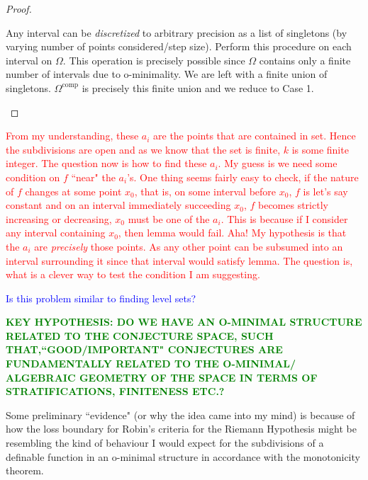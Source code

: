 \begin{proof}
\begin{itemize}
        Any interval can be \textit{discretized} to arbitrary precision as a list of singletons (by varying number of points considered/step size). Perform this procedure on each interval on $\Omega$. This operation is precisely possible since $\Omega$ contains only a finite number of intervals due to o-minimality. We are left with a finite union of singletons. $\Omega^\text{comp}$ is precisely this finite union and we reduce to Case 1.
    \end{itemize}
\end{proof}

\textcolor{red}{From my understanding, these $a_i$ are the points that are contained in set. Hence the subdivisions are open and as we know that the set is finite, $k$ is some finite integer. The question now is how to find these $a_i$. My guess is we need some condition on $f$ ``near" the $a_i$'s. One thing seems fairly easy to check, if the nature of $f$ changes at some point $x_0$, that is, on some interval before $x_0$, $f$ is let's say constant and on an interval immediately succeeding $x_0$, $f$ becomes strictly increasing or decreasing, $x_0$ must be one of the $a_i$. This is because if I consider any interval containing $x_0$, then lemma would fail. Aha! My hypothesis is that the $a_i$ are \textit{precisely} those points. As any other point can be subsumed into an interval surrounding it since that interval would satisfy lemma. The question is, what is a clever way to test the condition I am suggesting.}
\par
\textcolor{blue}{Is this problem similar to finding level sets?}

\textcolor{green}{\textbf{KEY HYPOTHESIS: DO WE HAVE AN O-MINIMAL STRUCTURE RELATED TO THE CONJECTURE SPACE, SUCH THAT,``GOOD/IMPORTANT" CONJECTURES 
ARE FUNDAMENTALLY RELATED TO THE O-MINIMAL/ ALGEBRAIC GEOMETRY OF THE SPACE IN TERMS OF STRATIFICATIONS, FINITENESS ETC.?}
}

Some preliminary ``evidence" (or why the idea came into my mind) is because of how the loss boundary for Robin's criteria for the Riemann Hypothesis might be resembling the kind of behaviour I would expect for the subdivisions of a definable function in an o-minimal structure in accordance with the monotonicity theorem.
